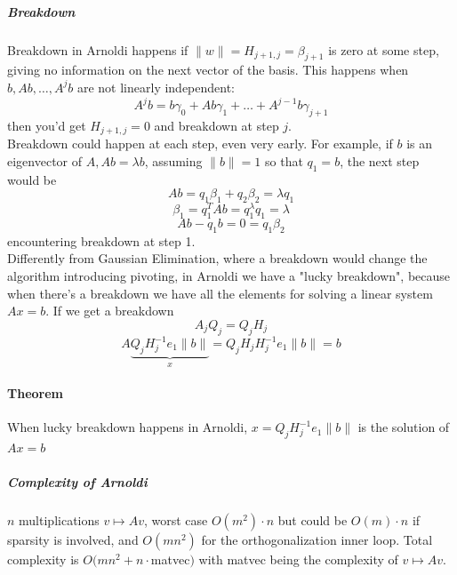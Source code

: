 \documentclass[10pt]{report}
\begin{document}
\subparagraph{Breakdown} Breakdown in Arnoldi happens if $\|w\|= H_{j+1,j} = \beta_{j+1}$ is zero at some step, giving no information on the next vector of the basis. This happens when $b,Ab,\ldots,A^jb$ are not linearly independent:
$$A^jb = b\gamma_0+Ab\gamma_1+\ldots+A^{j-1}b\gamma_{j+1}$$
then you'd get $H_{j+1,j}=0$ and breakdown at step $j$.\\
Breakdown could happen at each step, even very early. For example, if $b$ is an eigenvector of $A, Ab= \lambda b$, assuming $\|b\|=1$ so that $q_1=b$, the next step would be
$$Ab = q_1\beta_1+q_2\beta_2 = \lambda q_1$$
$$\beta_1 = q_1^TAb = q_1^\lambda q_1 = \lambda$$
$$Ab-q_1b = 0 = q_1\beta_2$$
encountering breakdown at step 1.\\
Differently from Gaussian Elimination, where a breakdown would change the algorithm introducing pivoting, in Arnoldi we have a "lucky breakdown", because when there's a breakdown we have all the elements for solving a linear system $Ax=b$. If we get a breakdown $$A_jQ_j = Q_jH_j$$
$$A\underset{x}{\underbrace{Q_jH_j^{-1}e_1\|b\|}} = Q_jH_jH_j^{-1}e_1\|b\|=b$$
\paragraph{Theorem} When lucky breakdown happens in Arnoldi, $x=Q_jH_j^{-1}e_1\|b\|$ is the solution of $Ax = b$
\subparagraph{Complexity of Arnoldi} $n$ multiplications $v\mapsto Av$, worst case $O(m^2)\cdot n$ but could be $O(m)\cdot n$ if sparsity is involved, and $O(mn^2)$ for the orthogonalization inner loop. Total complexity is $O(mn^2+n\cdot$matvec$)$ with matvec being the complexity of $v\mapsto Av$.
\end{document}
